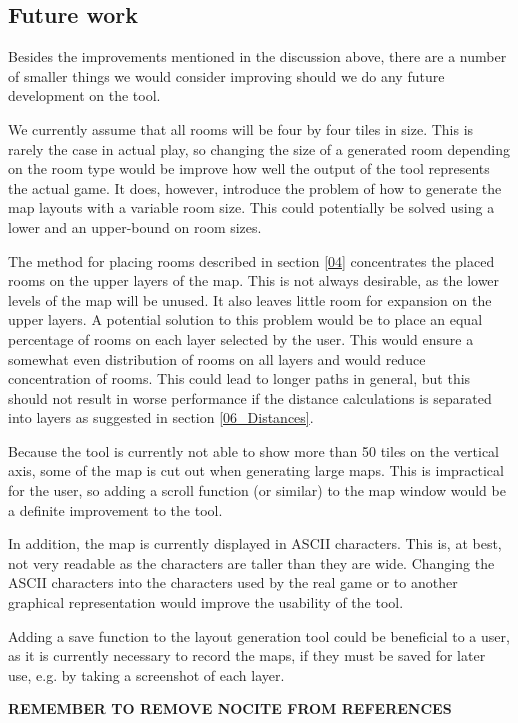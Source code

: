 \subsection{Future work}
Besides the improvements mentioned in the discussion above, there are a number of smaller things we would consider improving should we do any future development on the tool.

We currently assume that all rooms will be four by four tiles in size. This is rarely the case in actual play, so changing the size of a generated room depending on the room type would be improve how well the output of the tool represents the actual game. It does, however, introduce the problem of how to generate the map layouts with a variable room size. This could potentially be solved using a lower and an upper-bound on room sizes.

The method for placing rooms described in section \ref{04} concentrates the placed rooms on the upper layers of the map. This is not always desirable, as the lower levels of the map will be unused. It also leaves little room for expansion on the upper layers. A potential solution to this problem would be to place an equal percentage of rooms on each layer selected by the user. This would ensure a somewhat even distribution of rooms on all layers and would reduce concentration of rooms. This could lead to longer paths in general, but this should not result in worse performance if the distance calculations is separated into layers as suggested in section \ref{06_Distances}.

Because the tool is currently not able to show more than 50 tiles on the vertical axis, some of the map is cut out when generating large maps. This is impractical for the user, so adding a scroll function (or similar) to the map window would be a definite improvement to the tool.

In addition, the map is currently displayed in ASCII characters. This is, at best, not very readable as the characters are taller than they are wide. Changing the ASCII characters into the characters used by the real game or to another graphical representation would improve the usability of the tool.

Adding a save function to the layout generation tool could be beneficial to a user, as it is currently necessary to record the maps, if they must be saved for later use, e.g. by taking a screenshot of each layer.

\textbf{REMEMBER TO REMOVE NOCITE FROM REFERENCES}